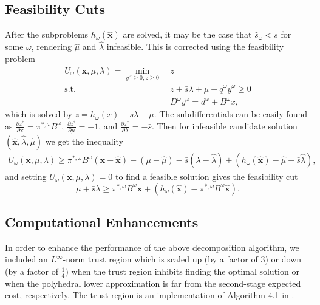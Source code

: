 \documentclass[opre,nonblindrev]{informs3} %
\newcommand{\x}{\mathbf{x}}
\newcommand{\xh}{\hat{\x}}
\newcommand{\lh}{\hat{\lambda}}
\newcommand{\mh}{\hat{\mu}}
\newcommand{\st}{\mbox{s.t.}}
\begin{document}
\subsection{Feasibility Cuts}
After the subproblems $h_\omega(\xh)$ are solved, it may be the case that $\hat{s}_\omega < \bar{s}$ for some $\omega$, rendering $\mh$ and $\lh$ infeasible.
This is corrected using the feasibility problem
\begin{align*}
	U_\omega(\x,\mu,\lambda) = \min_{y^\omega \geq 0, z \geq 0} \ & z \\
	\st \ & z + \bar{s}\lambda + \mu - q^\omega y^\omega \geq 0 \\
	& D^\omega y^\omega = d^\omega + B^\omega x,
\end{align*}
which is solved by $z = h_\omega(x) - \bar{s}\lambda - \mu$.
The subdifferentials can be easily found as $\frac{\partial z^*}{\partial \x} = \pi^{*,\omega} B^\omega$, $\frac{\partial z^*}{\partial \mu} = -1$, and $\frac{\partial z^*}{\partial \lambda} = -\bar{s}$.
Then for infeasible candidate solution $(\xh,\lh,\mh)$ we get the inequality
\begin{align*}
	U_\omega(\x,\mu,\lambda) \geq \pi^{*,\omega}B^\omega(\x-\xh) - (\mu -\mh) - \bar{s}(\lambda - \lh) + (h_\omega(\xh) - \mh - \bar{s}\lh),
\end{align*}
and setting $U_\omega(\x,\mu,\lambda) = 0$ to find a feasible solution gives the feasibility cut
\[
	\mu + \bar{s} \lambda \geq \pi^{*,\omega}B^\omega \x + (h_\omega(\xh) - \pi^{*,\omega}B^\omega\xh).
\]


\subsection{Computational Enhancements}

In order to enhance the performance of the above decomposition algorithm, we included an $L^\infty$-norm trust region which is scaled up (by a factor of $3$) or down (by a factor of $\tfrac{1}{4}$) when the trust region inhibits finding the optimal solution or when the polyhedral lower approximation is far from the second-stage expected cost, respectively.
The trust region is an implementation of Algorithm 4.1 in \cite{nocedal1999numerical}.
\end{document}
